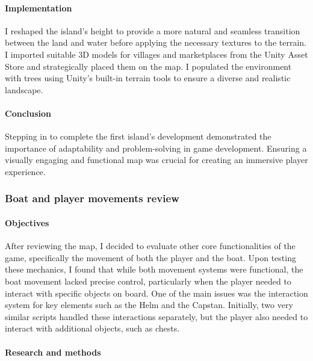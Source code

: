 \documentclass{article}
\begin{document}
\paragraph{Implementation}\hfill

I reshaped the island's height to provide a more natural and seamless transition between the land and water before applying the necessary textures to the terrain. I imported suitable 3D models for villages and marketplaces from the Unity Asset Store and strategically placed them on the map. I populated the environment with trees using Unity's built-in terrain tools to ensure a diverse and realistic landscape.

\paragraph{Conclusion}\hfill

Stepping in to complete the first island's development demonstrated the importance of adaptability and problem-solving in game development. Ensuring a visually engaging and functional map was crucial for creating an immersive player experience.



\subsubsection{Boat and player movements review}
\paragraph{Objectives}\hfill

After reviewing the map, I decided to evaluate other core functionalities of the game, specifically the movement of both the player and the boat. Upon testing these mechanics, I found that while both movement systems were functional, the boat movement lacked precise control, particularly when the player needed to interact with specific objects on board. One of the main issues was the interaction system for key elements such as the Helm and the Capstan. Initially, two very similar scripts handled these interactions separately, but the player also needed to interact with additional objects, such as chests.

\paragraph{Research and methods}\hfill
\end{document}
